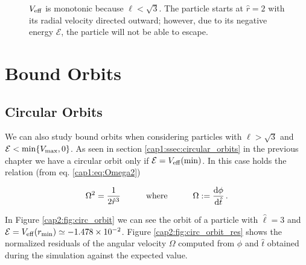 \begin{figure}[h!]
\begin{minipage}{0.48\textwidth}
        \caption{$V_{\rm eff}$ is monotonic because $\ell < \sqrt{3}$.
        The particle starts at $\hat r = 2$ with its radial velocity
        directed outward; however, due to its negative energy $\mathcal E$, the
        particle will not be able to escape.}
    \end{minipage}
\end{figure}


\section{Bound Orbits}

\subsection{Circular Orbits}

We can also study bound orbits when considering particles with
$\hat \ell > \sqrt{3}$ and $\mathcal E < \min \{V_{\rm max}, 0\}$.
As seen in section \ref{cap1:ssec:circular_orbits} in the previous chapter we
have a circular orbit only if $\mathcal E = V_{\rm eff}({\rm min})$.
In this case holds the relation (from eq. \ref{cap1:eq:Omega2})

\begin{equation}
    \Omega^2 = \frac{1}{2 \hat r^3}
    \quad \quad \quad {\rm where} \quad \quad \quad
    \Omega := \dv{\phi}{\hat t} \, .
\end{equation}

In Figure \ref{cap2:fig:circ_orbit} we can see the orbit of a particle with
$\hat \ell = 3$ and $\mathcal E = V_{\rm eff}(r_{\rm min}) \simeq
\num{-1.478e-02}$.
Figure \ref{cap2:fig:circ_orbit_res} shows the normalized residuals of the
angular velocity $\Omega$ computed from $\phi$ and $\hat t$ obtained during the
simulation against the expected value.


